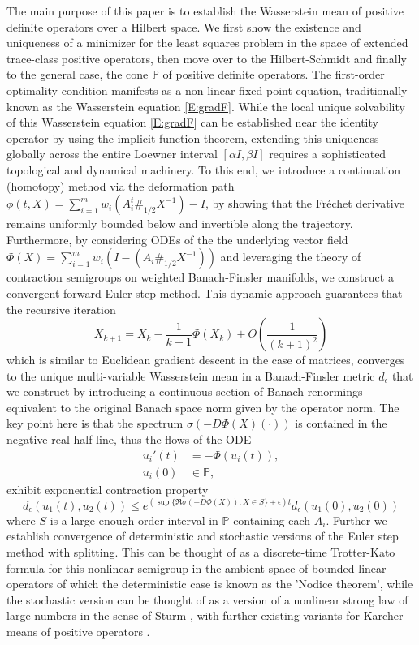 \documentclass[12pt,reqno]{amsart}
\begin{document}
The main purpose of this paper is to establish the Wasserstein mean of positive definite operators over a Hilbert space.
We first show the existence and uniqueness of a minimizer for the least squares problem in the space of extended trace-class positive operators, then move over to the Hilbert-Schmidt and finally to the general case, the cone $\mathbb{P}$ of positive definite operators. The first-order optimality condition manifests as a non-linear fixed point equation, traditionally known as the Wasserstein equation \eqref{E:gradF}.
While the local unique solvability of this Wasserstein equation \eqref{E:gradF} can be established near the identity operator by using the implicit function theorem, extending this uniqueness globally across the entire Loewner interval $[\alpha I, \beta I]$ requires a sophisticated topological and dynamical machinery.
To this end, we introduce a continuation (homotopy) method via the deformation path $\displaystyle \phi(t,X) = \sum_{i=1}^{m} w_{i} (A_{i}^{t} \#_{1/2} X^{-1}) - I$, by showing that the Fr\'{e}chet derivative remains uniformly bounded below and invertible along the trajectory.
Furthermore, by considering ODEs of the the underlying vector field $\displaystyle \Phi(X) = \sum_{i=1}^{m} w_{i} (I - (A_{i} \#_{1/2} X^{-1}))$ and leveraging the theory of contraction semigroups on weighted Banach-Finsler manifolds, we construct a convergent forward Euler step method.
This dynamic approach guarantees that the recursive iteration
\begin{displaymath}
X_{k+1} = X_{k} - \frac{1}{k+1} \Phi(X_{k}) + O \left( \frac{1}{(k+1)^2} \right)
\end{displaymath}
which is similar to Euclidean gradient descent in the case of matrices, converges to the unique multi-variable Wasserstein mean in a Banach-Finsler metric $d_{\epsilon}$ that we construct by introducing a continuous section of Banach renormings equivalent to the original Banach space norm given by the operator norm. The key point here is that the spectrum $\sigma(-D\Phi(X)(\cdot))$ is contained in the negative real half-line, thus the flows of the ODE
\begin{align*}
    u_i'(t) &= - \Phi(u_i(t)), \\
    u_i(0) &\in\mathbb{P},
\end{align*}
exhibit exponential contraction property
\begin{equation*}
d_\epsilon(u_1(t), u_2(t)) \leq e^{(\sup\{\Re\sigma(-D\Phi(X)):X\in S\}+\epsilon) t} d_\epsilon(u_1(0), u_2(0))
\end{equation*}
where $S$ is a large enough order interval in $\mathbb{P}$ containing each $A_i$.
Further we establish convergence of deterministic and stochastic versions of the Euler step method with splitting. This can be thought of as a discrete-time Trotter-Kato formula for this nonlinear semigroup in the ambient space of bounded linear operators of which the deterministic case is known as the 'Nodice theorem', while the stochastic version can be thought of as a version of a nonlinear strong law of large numbers in the sense of Sturm \cite{sturm}, with further existing variants for Karcher means of positive operators \cite{lekapalfia, LP,  PalfiaStrong}.
\end{document}
